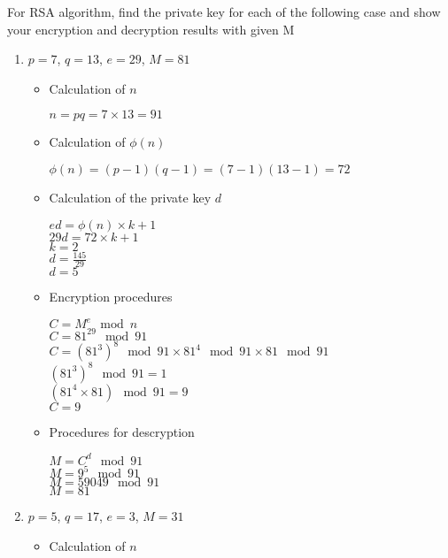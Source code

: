 \documentclass[12]{article}
\begin{document}
For RSA algorithm, find the private key for each of the following case and show your encryption and decryption results with given  M

\begin{enumerate}
	\item $p = 7$, $q = 13$, $e = 29$, $M = 81$ 
	
	 	\begin{itemize}
	 		\item   Calculation of $n$
			
			$n = pq = 7 \times  13 = 91$ \\
			
			\item Calculation of $\phi(n)$ 	
			
			$\phi(n) = ( p - 1)( q - 1 ) = ( 7 - 1)( 13 - 1 ) = 72$	
			
			\item Calculation of the private key $d$
			
			$ed = \phi(n) \times k + 1$ \\
			$29d = 72 \times k + 1 $ \\
			$k = 2$\\
			$d =  \frac{145}{29}$ \\
			$d = 5$
			
			\item Encryption procedures 
			
			$C = M^e \mod n$ \\
			$C = 81^{29} \mod 91$ \\
			$C = ( 81^3)^8 \mod 91 \times 81^4 \mod 91 \times  81 \mod 91$ \\
			$(81^3)^8 \mod 91 = 1$\\
			$(81^4 \times 81) \mod 91 =  9$ \\
			$C = 9$
			
			
			\item Procedures for descryption
			
			$M = C^d \mod 91$ \\
			$M = 9^5 \mod 91$ \\
			$M = 59049 \mod 91$ \\
			$M = 81$
	 		
	 	\end{itemize}
	 	
		\item $p = 5$, $q = 17$, $e = 3$, $M = 31$	
			
		\begin{itemize}
			\item   Calculation of $n$
			

\end{itemize}
\end{enumerate}
\end{document}
